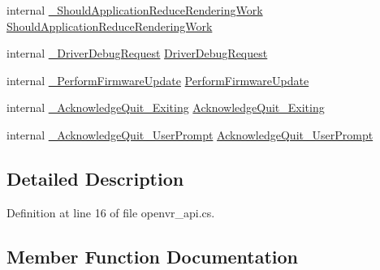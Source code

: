 \begin{DoxyCompactItemize}
\item 
internal \mbox{\hyperlink{struct_valve_1_1_v_r_1_1_i_v_r_system_a6f55813bd7702e935e3313a50f27fd87}{\+\_\+\+Should\+Application\+Reduce\+Rendering\+Work}} \mbox{\hyperlink{struct_valve_1_1_v_r_1_1_i_v_r_system_a24eff068adfd4b8924e9e1224406d14e}{Should\+Application\+Reduce\+Rendering\+Work}}
\item 
internal \mbox{\hyperlink{struct_valve_1_1_v_r_1_1_i_v_r_system_a818e951800bb68fb2ae856f7f12dd2fe}{\+\_\+\+Driver\+Debug\+Request}} \mbox{\hyperlink{struct_valve_1_1_v_r_1_1_i_v_r_system_a8135bdde65be17613157cc5df69f769a}{Driver\+Debug\+Request}}
\item 
internal \mbox{\hyperlink{struct_valve_1_1_v_r_1_1_i_v_r_system_ab19faf642558ef1a557fb70618db9ba3}{\+\_\+\+Perform\+Firmware\+Update}} \mbox{\hyperlink{struct_valve_1_1_v_r_1_1_i_v_r_system_ac265d711916027dad4c18fddf66c8824}{Perform\+Firmware\+Update}}
\item 
internal \mbox{\hyperlink{struct_valve_1_1_v_r_1_1_i_v_r_system_aa692c4d5b5097052364afcb966fd63cd}{\+\_\+\+Acknowledge\+Quit\+\_\+\+Exiting}} \mbox{\hyperlink{struct_valve_1_1_v_r_1_1_i_v_r_system_a6b60311b536677d807becf55bada9760}{Acknowledge\+Quit\+\_\+\+Exiting}}
\item 
internal \mbox{\hyperlink{struct_valve_1_1_v_r_1_1_i_v_r_system_a4309327757a4f929aeb20c09f12f16b4}{\+\_\+\+Acknowledge\+Quit\+\_\+\+User\+Prompt}} \mbox{\hyperlink{struct_valve_1_1_v_r_1_1_i_v_r_system_a400312901662b9450b7a450f18119ea0}{Acknowledge\+Quit\+\_\+\+User\+Prompt}}
\end{DoxyCompactItemize}


\subsection{Detailed Description}


Definition at line 16 of file openvr\+\_\+api.\+cs.



\subsection{Member Function Documentation}
\mbox{\label{struct_valve_1_1_v_r_1_1_i_v_r_system_aa692c4d5b5097052364afcb966fd63cd}} 
